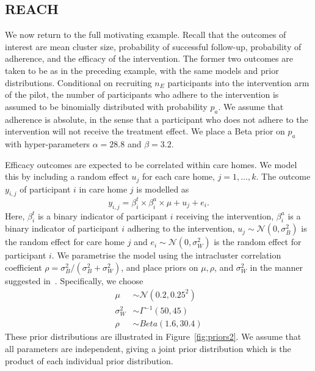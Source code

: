 \documentclass{article} %
\begin{document}
\subsection{REACH}

We now return to the full motivating example. Recall that the outcomes of interest are mean cluster size, probability of successful follow-up, probability of adherence, and the efficacy of the intervention. The former two outcomes are taken to be as in the preceding example, with the same models and prior distributions. Conditional on recruiting $n_{E}$ participants into the intervention arm of the pilot, the number of participants who adhere to the intervention is assumed to be binomially distributed with probability $p_{a}$. We assume that adherence is absolute, in the sense that a participant who does not adhere to the intervention will not receive the treatment effect. We place a Beta prior on $p_{a}$ with hyper-parameters $\alpha = 28.8$ and $\beta = 3.2$. 

Efficacy outcomes are expected to be correlated within care homes. We model this by including a random effect  $u_{j}$ for each care home, $j = 1, \ldots , k$. The outcome $y_{i,j}$ of participant $i$ in care home $j$ is modelled as 
\begin{equation}
y_{i,j} = \beta^{t}_{i} \times \beta^{a}_{i} \times \mu + u_{j} + e_{i}.
\end{equation}
Here, $\beta^{t}_{i}$ is a binary indicator of participant $i$ receiving the intervention, $\beta^{a}_{i}$ is a binary indicator of participant $i$ adhering to the intervention, $u_{j} \sim \mathcal{N}(0, \sigma_{B}^{2})$ is the random effect for care home $j$ and $e_{i} \sim \mathcal{N}(0, \sigma_{W}^{2})$ is the random effect for participant $i$. We parametrise the model using the intracluster correlation coefficient $\rho = \sigma_{B}^{2} / (\sigma_{B}^{2} + \sigma_{W}^{2})$, and place priors on $\mu, \rho$, and $\sigma_{W}^{2}$ in the manner suggested in~\cite{Spiegelhalter2001}. Specifically, we choose
\begin{align}
\mu & \sim \mathcal{N}(0.2, 0.25^{2}) \\
\sigma_{W}^{2} & \sim \Gamma^{-1}(50, 45) \\
\rho & \sim Beta(1.6, 30.4)
\end{align}
These prior distributions are illustrated in Figure~\ref{fig:priors2}. We assume that all parameters are independent, giving a joint prior distribution which is the product of each individual prior distribution.
\end{document}
